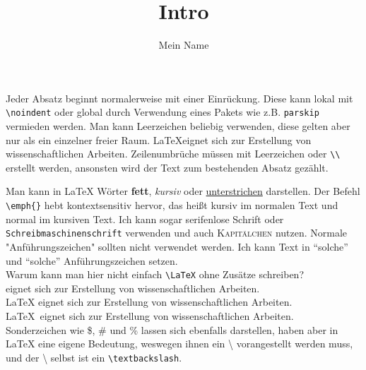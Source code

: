 \documentclass[11pt,a4paper]{article}
\title{Intro}
\author{Mein Name}
\begin{document}
\maketitle %

Jeder Absatz beginnt normalerweise mit einer Einrückung.
Diese kann lokal mit \verb|\noindent| oder global
durch Verwendung eines Pakets wie z.B. \verb|parskip| vermieden werden.
Man kann Leerzeichen     beliebig     verwenden,
diese gelten aber nur als ein einzelner freier Raum.
\LaTeX     eignet sich zur Erstellung von wissenschaftlichen Arbeiten.
Zeilenumbrüche müssen mit Leerzeichen oder \verb|\\| erstellt werden,
ansonsten wird der Text zum bestehenden Absatz gezählt.

Man kann in \LaTeX{} Wörter \textbf{fett}, \textit{kursiv} oder \underline{unterstrichen} darstellen.
Der Befehl \verb|\emph{}| hebt kontextsensitiv hervor,
das heißt kursiv im normalen Text und normal im kursiven Text.
Ich kann sogar \textsf{serifenlose Schrift} oder \texttt{Schreibmaschinenschrift} verwenden
und auch \textsc{Kapitälchen} nutzen. Normale "Anführungszeichen" sollten nicht verwendet werden.
Ich kann Text in "`solche"' und ``solche'' Anführungszeichen setzen.\\

\noindent Warum kann man hier nicht einfach \verb|\LaTeX| ohne Zusätze schreiben?\\

\noindent{\LaTeX } eignet sich zur Erstellung von wissenschaftlichen Arbeiten.\\
\noindent\LaTeX{} eignet sich zur Erstellung von wissenschaftlichen Arbeiten.\\
\noindent\LaTeX\ eignet sich zur Erstellung von wissenschaftlichen Arbeiten.\\

Sonderzeichen wie \$, \# und \% lassen sich ebenfalls darstellen,
haben aber in \LaTeX{} eine eigene Bedeutung,
weswegen ihnen ein \textbackslash{} vorangestellt werden muss,
und der \textbackslash{} selbst ist ein \verb|\textbackslash|.
\end{document}

